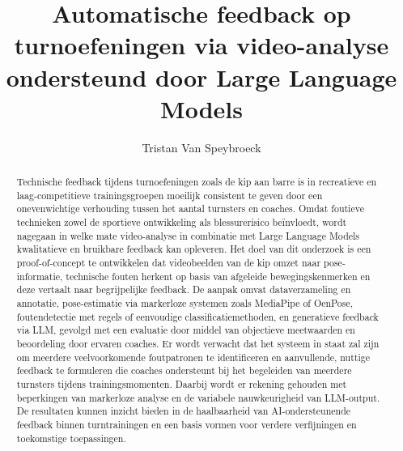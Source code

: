 \documentclass{hogent-article}
\title{Automatische feedback op turnoefeningen via video-analyse ondersteund door Large Language Models}
\author{Tristan Van Speybroeck}
\begin{document}
\begin{abstract}
  Technische feedback tijdens turnoefeningen zoals de kip aan barre is in recreatieve en laag-competitieve trainingsgroepen moeilijk consistent te geven door een onevenwichtige verhouding tussen het aantal turnsters en coaches. Omdat foutieve technieken zowel de sportieve ontwikkeling als blessurerisico beïnvloedt, wordt nagegaan in welke mate video-analyse in combinatie met Large Language Models kwalitatieve en bruikbare feedback kan opleveren. Het doel van dit onderzoek is een proof-of-concept te ontwikkelen dat videobeelden van de kip omzet naar pose-informatie, technische fouten herkent op basis van afgeleide bewegingskenmerken en deze vertaalt naar begrijpelijke feedback. De aanpak omvat dataverzameling en annotatie, pose-estimatie via markerloze systemen zoals MediaPipe of OenPose, foutendetectie met regels of eenvoudige classificatiemethoden, en generatieve feedback via LLM, gevolgd met een evaluatie door middel van objectieve meetwaarden en beoordeling door ervaren coaches. Er wordt verwacht dat het systeem in staat zal zijn om meerdere veelvoorkomende foutpatronen te identificeren en aanvullende, nuttige feedback te formuleren die coaches ondersteunt bij het begeleiden van meerdere turnsters tijdens trainingsmomenten. Daarbij wordt er rekening gehouden met beperkingen van markerloze analyse en de variabele nauwkeurigheid van LLM-output. De resultaten kunnen inzicht bieden in de haalbaarheid van AI-ondersteunende feedback binnen turntrainingen en een basis vormen voor verdere verfijningen en toekomstige toepassingen. 
\end{abstract}

\tableofcontents



\printbibliography[heading=bibintoc]
\end{document}

